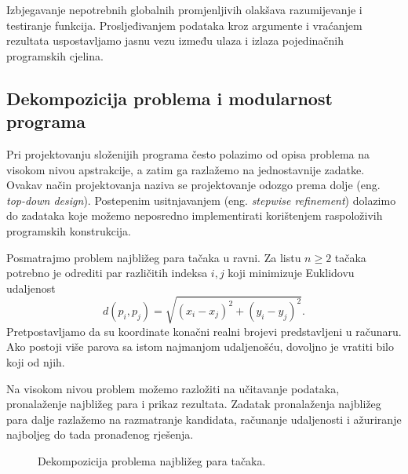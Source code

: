Izbjegavanje nepotrebnih globalnih promjenljivih olakšava razumijevanje i testiranje funkcija. Prosljeđivanjem podataka kroz argumente i vraćanjem rezultata uspostavljamo jasnu vezu između ulaza i izlaza pojedinačnih programskih cjelina.

\subsection{Dekompozicija problema i modularnost programa}

Pri projektovanju složenijih programa često polazimo od opisa problema na visokom nivou apstrakcije, a zatim ga razlažemo na jednostavnije zadatke. Ovakav način projektovanja naziva se projektovanje odozgo prema dolje (eng. \textit{top-down design}). Postepenim usitnjavanjem (eng. \textit{stepwise refinement}) dolazimo do zadataka koje možemo neposredno implementirati korištenjem raspoloživih programskih konstrukcija.

Posmatrajmo problem najbližeg para tačaka u ravni. Za listu $n\geq 2$ tačaka potrebno je odrediti par različitih indeksa $i,j$ koji minimizuje Euklidovu udaljenost
\[
d(p_i,p_j)=\sqrt{(x_i-x_j)^2+(y_i-y_j)^2}.
\]
Pretpostavljamo da su koordinate konačni realni brojevi predstavljeni u računaru. Ako postoji više parova sa istom najmanjom udaljenošću, dovoljno je vratiti bilo koji od njih.

Na visokom nivou problem možemo razložiti na učitavanje podataka, pronalaženje najbližeg para i prikaz rezultata. Zadatak pronalaženja najbližeg para dalje razlažemo na razmatranje kandidata, računanje udaljenosti i ažuriranje najboljeg do tada pronađenog rješenja.

\begin{figure}[H]
\centering
{}
\caption{Dekompozicija problema najbližeg para tačaka.}
\label{fig:proceduralna-dekompozicija}
\end{figure}

